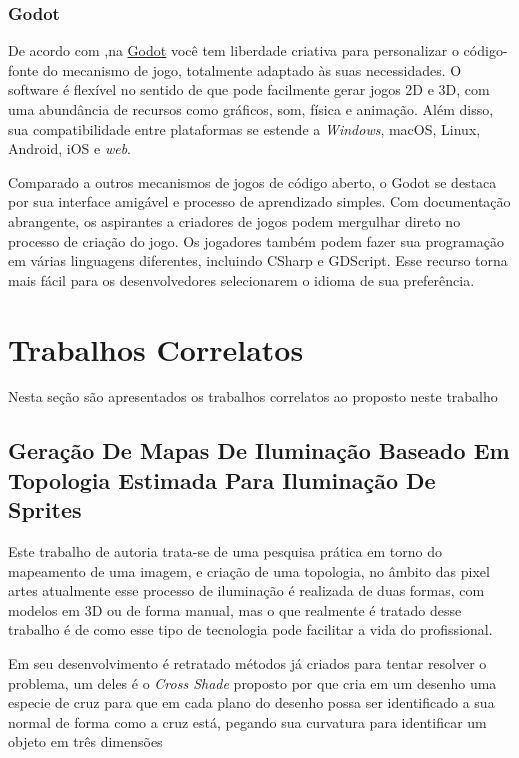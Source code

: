 \subsubsection{Godot}

De acordo com ,na \href{https://unity.com/pt}{Godot} você tem liberdade criativa para personalizar o código-fonte do mecanismo de jogo, totalmente adaptado às suas necessidades.  O software é flexível no sentido de que pode facilmente gerar jogos 2D e 3D, com uma abundância de recursos como gráficos, som, física e animação.  Além disso, sua compatibilidade entre plataformas se estende a \textit{Windows}, macOS, Linux, Android, iOS e \textit{web}.

Comparado a outros mecanismos de jogos de código aberto, o Godot se destaca por sua interface amigável e processo de aprendizado simples.  Com documentação abrangente, os aspirantes a criadores de jogos podem mergulhar direto no processo de criação do jogo.  Os jogadores também podem fazer sua programação em várias linguagens diferentes, incluindo CSharp e GDScript.  Esse recurso torna mais fácil para os desenvolvedores selecionarem o idioma de sua preferência.

\section{Trabalhos Correlatos}

Nesta seção são apresentados os trabalhos correlatos ao proposto neste trabalho

\subsection{Geração De Mapas De Iluminação Baseado Em Topologia Estimada Para Iluminação De Sprites}

Este trabalho de autoria  trata-se de uma pesquisa prática em torno do mapeamento de uma imagem, e criação de uma topologia, no âmbito das pixel artes atualmente esse processo de iluminação é realizada de duas formas, com modelos em 3D ou de forma manual, mas o que realmente é tratado desse trabalho é de como esse tipo de tecnologia pode facilitar a vida do profissional.

Em seu desenvolvimento é retratado métodos já criados para tentar resolver o problema, um deles é o \textit{Cross Shade} proposto por \cite{Shao2012} que cria em um desenho uma especie de cruz para que em cada plano do desenho possa ser identificado a sua normal de forma como a cruz está, pegando sua curvatura para identificar um objeto em três dimensões

